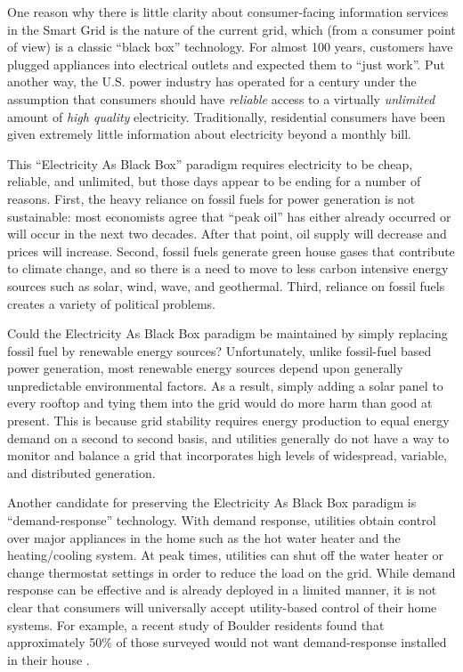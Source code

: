 One reason why there is little clarity about consumer-facing information
services in the Smart Grid is the nature of the current grid, which (from a
consumer point of view) is a classic ``black box'' technology.  For almost
100 years, customers have plugged appliances into electrical outlets and
expected them to ``just work''.  Put another way, the U.S. power industry
has operated for a century under the assumption that consumers should have
{\em reliable} access to a virtually {\em unlimited} amount of {\em high
  quality} electricity.  Traditionally, residential consumers have been
given extremely little information about electricity beyond a monthly bill.

This ``Electricity As Black Box'' paradigm requires electricity to be cheap,
reliable, and unlimited, but those days appear to be ending for a number of
reasons.  First, the heavy reliance on fossil fuels for power generation is
not sustainable: most economists agree that ``peak oil'' has either already
occurred or will occur in the next two decades. After that point, oil
supply will decrease and prices will increase.  Second, fossil fuels
generate green house gases that contribute to climate change, and so there
is a need to move to less carbon intensive energy sources such as solar,
wind, wave, and geothermal.  Third, reliance on fossil fuels creates a
variety of political problems.

Could the Electricity As Black Box paradigm be maintained by simply
replacing fossil fuel by renewable energy sources? Unfortunately,
unlike fossil-fuel based power generation, most renewable energy sources
depend upon generally unpredictable environmental
factors.  As a result, simply adding a solar panel to every rooftop and
tying them into the grid would do more harm than good at present.
This is because grid stability requires energy production to equal energy demand
on a second to second basis, and utilities generally do not have a way to
monitor and balance a grid that incorporates high levels of widespread,
variable, and distributed generation. 

Another candidate for preserving the Electricity As Black Box paradigm
is ``demand-response'' technology.  With demand response,
utilities obtain control over major appliances in the home such as the hot
water heater and the heating/cooling system. At peak times, utilities can
shut off the water heater or change thermostat settings in order to reduce
the load on the grid.  While demand response can be effective and is
already deployed in a limited manner, it is not clear that
consumers will universally accept utility-based control of their home
systems.  For example, a recent study of Boulder residents found that
approximately 50\% of those surveyed would not want demand-response
installed in their house \cite{Farhar09}.


